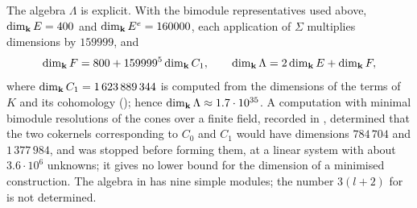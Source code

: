\begin{remark}
  \label{rem:ar-sizes}
  The algebra $\Lambda$ is explicit. With the bimodule
  representatives used above, ${\dim_{\mathbf{k}} E=400}$ and ${\dim_{\mathbf{k}} E^e=160000}$, each
  application of $\Sigma$ multiplies dimensions by $159999$, and
  \[
    \dim_{\mathbf{k}} F=800+159999^5\dim_{\mathbf{k}} C_1,\qquad
    \dim_{\mathbf{k}}\Lambda=2\dim_{\mathbf{k}} E+\dim_{\mathbf{k}} F,
  \]
  where ${\dim_{\mathbf{k}} C_1=1\,623\,889\,344}$ is computed from the dimensions of the
  terms of $K$ and its cohomology (); hence
  ${\dim_{\mathbf{k}}\Lambda\approx1.7\cdot10^{35}}$. A computation with minimal bimodule
  resolutions of the cones over a finite field, recorded in
  , determined that the two cokernels corresponding
  to $C_0$ and $C_1$ would have dimensions $784\,704$ and $1\,377\,984$, and
  was stopped before forming them, at a linear system with about
  ${3.6\cdot10^6}$ unknowns; it gives no lower bound for the dimension of a
  minimised construction. The algebra in  has nine simple
  modules; the number ${3(l+2)}$ for  is not determined.
\end{remark}

